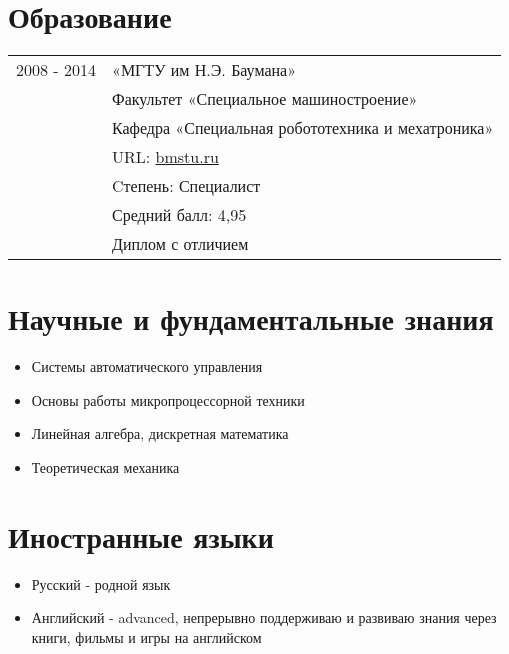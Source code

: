 \documentclass[a4paper, 11pt]{article}
\begin{document}
\section{Образование}
\begin{tabular}{p{25mm}|p{110mm}}
2008 - 2014         & «МГТУ им Н.Э. Баумана»                            \\
                    & Факультет «Специальное машиностроение»            \\
                    & Кафедра «Специальная робототехника и мехатроника» \\
                    & URL: \href{http://bmstu.ru}{bmstu.ru}             \\
                    & Cтепень: Специалист                               \\
                    & Средний балл: 4,95                                \\
                    & Диплом с отличием
\end{tabular}

\section{Научные и фундаментальные знания}
\begin{itemize}
    \item Системы автоматического управления
    \item Основы работы микропроцессорной техники
    \item Линейная алгебра, дискретная математика
    \item Теоретическая механика
\end{itemize}

\section{Иностранные языки}
\begin{itemize}
    \item   Русский    - родной язык
    \item   Английский - advanced, непрерывно поддерживаю и развиваю знания через
            книги, фильмы и игры на английском
\end{itemize}
\end{document}
